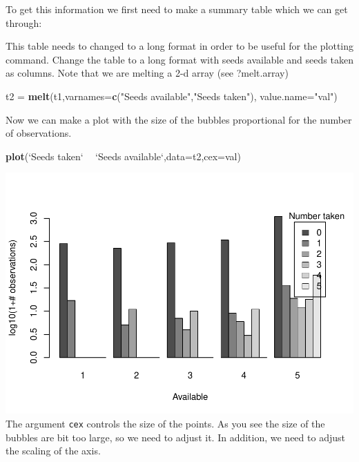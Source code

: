 \documentclass[11pt,]{article}
\newenvironment{Shaded}{\begin{snugshade}}{\end{snugshade}}
\newcommand{\KeywordTok}[1]{\textcolor[rgb]{0.13,0.29,0.53}{\textbf{#1}}}
\newcommand{\DataTypeTok}[1]{\textcolor[rgb]{0.13,0.29,0.53}{#1}}
\newcommand{\StringTok}[1]{\textcolor[rgb]{0.31,0.60,0.02}{#1}}
\newcommand{\OperatorTok}[1]{\textcolor[rgb]{0.81,0.36,0.00}{\textbf{#1}}}
\newcommand{\NormalTok}[1]{#1}
\begin{document}
To get this information we first need to make a summary table which we
can get through:

\begin{Shaded}
\end{Shaded}

This table needs to changed to a long format in order to be useful for
the plotting command. Change the table to a long format with seeds
available and seeds taken as columns. Note that we are melting a 2-d
array (see ?melt.array)

\begin{Shaded}
\begin{Highlighting}[]
\NormalTok{t2 =}\StringTok{ }\KeywordTok{melt}\NormalTok{(t1,}\DataTypeTok{varnames=}\KeywordTok{c}\NormalTok{(}\StringTok{"Seeds available"}\NormalTok{,}\StringTok{"Seeds taken"}\NormalTok{),}
          \DataTypeTok{value.name=}\StringTok{"val"}\NormalTok{)}
\end{Highlighting}
\end{Shaded}

Now we can make a plot with the size of the bubbles proportional for the
number of observations.

\begin{Shaded}
\begin{Highlighting}[]
\KeywordTok{plot}\NormalTok{(}\StringTok{`}\DataTypeTok{Seeds taken}\StringTok{`} \OperatorTok{~}\StringTok{ `}\DataTypeTok{Seeds available}\StringTok{`}\NormalTok{,}\DataTypeTok{data=}\NormalTok{t2,}\DataTypeTok{cex=}\NormalTok{val)}
\end{Highlighting}
\end{Shaded}

\includegraphics{Lab_2_modified_files/figure-latex/unnamed-chunk-39-1.pdf}
The argument \texttt{cex} controls the size of the points. As you see
the size of the bubbles are bit too large, so we need to adjust it. In
addition, we need to adjust the scaling of the axis.
\end{document}
